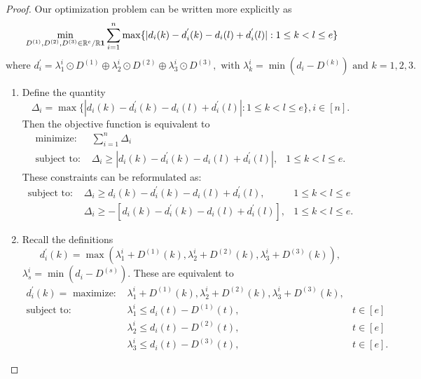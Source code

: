 \documentclass[12pt]{extarticle}
\numberwithin{theorem}{section}
\newcommand{\RR}{\mathbb{R}}
\begin{document}
\begin{proof}
Our optimization problem can be written more explicitly as
$$\min_{D^{(1)},D^{(2)},D^{(3)}\in \RR^e/\RR{\bf 1}}\sum_{i=1}^{n}\max \{|d_{i}(k)-d^{'}_{i}(k)-d_{i}(l)+d^{'}_{i}(l)|:1 \le k < l \le e\}$$
$$\text{where } d_i^{'} = \lambda_1^i \odot D^{(1)} \oplus \lambda_2^i \odot D^{(2)} \oplus \lambda_3^i \odot D^{(3)}, \text{ with }\lambda_k^i = \min(d_i - D^{(k)}) \text{ and } k=1,2,3.$$
\begin{enumerate}[label=(\roman*)]
\item Define the quantity 
$$\Delta_i = \max \{|d_{i}(k)-d^{'}_{i}(k)-d_{i}(l)+d^{'}_{i}(l)|:1 \le k < l \le e\}, i\in [n].$$
Then the objective function is equivalent to
\begin{align*}
\text{minimize: } & {}\sum_{i=1}^{n}\Delta_i &\\
\text{subject to: } & \Delta_i \ge |d_{i}(k)-d^{'}_{i}(k)-d_{i}(l)+d^{'}_{i}(l)|, & 1 \le k < l \le e.
\end{align*}
These constraints can be reformulated as:
\begin{align*}
\text{subject to: } &\Delta_i \ge d_{i}(k)-d^{'}_{i}(k)-d_{i}(l)+d^{'}_{i}(l), & 1 \le k < l \le e\\
& \Delta_i \ge -[d_{i}(k)-d^{'}_{i}(k)-d_{i}(l)+d^{'}_{i}(l)], & 1 \le k < l \le e.
\end{align*}

\item Recall the definitions
$$d^{'}_i(k)=\max(\lambda_1^i +D^{(1)}(k), \lambda_2^i +D^{(2)}(k), \lambda_3^i +D^{(3)}(k)),$$
$\lambda_s^i = \min(d_i - D^{(s)})$.
These are equivalent to
\begin{align*}
d^{'}_i(k)=\text{ maximize: } & \lambda_1^i +D^{(1)}(k), \lambda_2^i+ D^{(2)}(k), \lambda_3^i +D^{(3)}(k), & \\
\text{subject to: } & \lambda_1^i \le d_i (t)- D^{(1)}(t), & t\in [e] \\
& \lambda_2^i \le d_i (t)- D^{(2)}(t), & t\in [e] \\
& \lambda_3^i \le d_i (t)- D^{(3)}(t), & t\in [e].
\end{align*}



\end{enumerate}
\end{proof}
\end{document}

